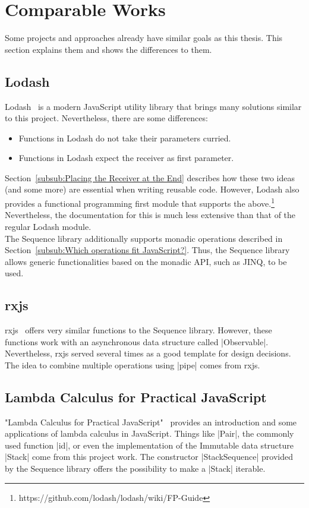 \section{Comparable Works} %
\label{sec:Comparable Works}
Some projects and approaches already have similar goals as this thesis. This
section explains them and shows the differences to them.

\subsection{Lodash} %
\label{sub:Lodash}
Lodash~\cite{lodash_2023} is a modern JavaScript utility library that brings many solutions
similar to this project. Nevertheless, there are some differences:
\begin{itemize}
  \item Functions in Lodash do not take their parameters curried.
  \item Functions in Lodash expect the receiver as first parameter.
\end{itemize}
Section~\ref{subsub:Placing the Receiver at the End} describes how these two
ideas (and some more) are essential when writing reusable code. However, Lodash
also provides a functional programming first module that supports the
above.\footnote{https://github.com/lodash/lodash/wiki/FP-Guide}
Nevertheless, the documentation for this is much less extensive than that of
the regular Lodash module. \\ 
The Sequence library additionally supports monadic operations described in
Section~\ref{subsub:Which operations fit JavaScript?}. Thus, the Sequence
library allows generic functionalities based on the monadic API, such as JINQ,
to be used.

\subsection{rxjs} %
\label{sub:rxjs}
rxjs~\cite{rxjs_2023} offers very similar functions to the Sequence library.
However, these functions work with an asynchronous data structure called
|Observable|. Nevertheless, rxjs served several times as a good template for
design decisions. The idea to combine multiple operations using |pipe| comes
from rxjs.

\subsection{Lambda Calculus for Practical JavaScript} %
\label{sub:Lambda Calculus for Practical JavaScript}
"Lambda Calculus for Practical JavaScript"~\cite{andermatt_lambda_2022}
provides an introduction and some applications of lambda calculus in
JavaScript. Things like |Pair|, the commonly used function |id|, or even the
implementation of the Immutable data structure |Stack| come from this project
work. The constructor |StackSequence| provided by the Sequence library offers
the possibility to make a |Stack| iterable. 
